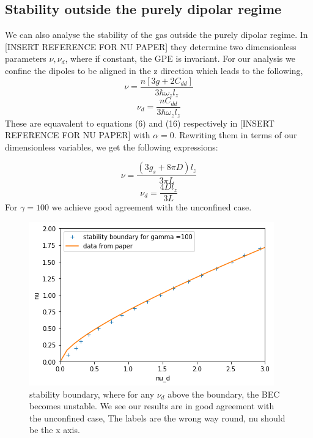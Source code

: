 \documentclass[10pt]{article}
\numberwithin{equation}{section}
\begin{document}
\begin{multicols}{2}
\section{Stability outside the purely dipolar regime}
We can also analyse the stability of the gas outside the purely dipolar regime. In [INSERT REFERENCE FOR NU PAPER] they determine two dimensionless parameters ${\nu,\nu_{d}}$, where if constant, the GPE is invariant. For our analysis we confine the dipoles to be aligned in the z direction which leads to the following,
 \begin{equation}
\nu = \frac{n[3g+2C_{dd}]}{3\hbar\omega_{z}l_{z}}
\end{equation} 
\begin{equation}
\nu_{d} = \frac{nC_{dd}}{3\hbar\omega_{z}l_{z}}
\end{equation} 
These are equavalent to equations (6) and (16) respectively in [INSERT REFERENCE FOR NU PAPER] with $\alpha=0$.
Rewriting them in terms of our dimensionless variables, we get the following expressions:

 \begin{equation}
\nu = \frac{(3g_{s}+8\pi D)l_{z}}{3\pi L}
\end{equation} 
\begin{equation}
\nu_{d} = \frac{4Dl_{z}}{3L}
\end{equation} 
For $\gamma=100$ we achieve good agreement with the unconfined case.

\begin{figure}[H]
\centering
\includegraphics[width=\linewidth]{stability boundary comparison}
\caption{stability boundary, where for any $\nu_{d}$ above the boundary, the BEC becomes unstable. We see our results are in good agreement with the unconfined case, The labels are the wrong way round, nu should be the x axis.}
\end{figure}


\end{multicols}
\end{document}
